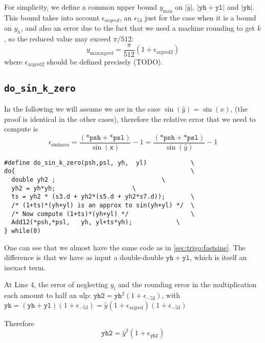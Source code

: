 For simplicity, we define a common upper bound $y_{\max}$ on
$|\hat{y}|$, $|\mathtt{yh}+\mathtt{yl}|$ and $|\mathtt{yh}|$. This
bound takes into account $\epsilon_{argred}$, an $\epsilon_{53}$ just
for the case when it is a bound on $y_h$, and also an error due to the
fact that we used a machine rounding to get $k$, so the reduced value
may exceed $\pi/512$:
\begin{equation}
  y_{\mathrm{maxargred}} = \frac{\pi}{512}(1+\epsilon_{\mathrm{argred2}})
  \label{eq:ymaxsink0}  
\end{equation}
where $\epsilon_{\mathrm{argred2}}$ should be defined precisely (TODO).


\subsection{\texttt{do\_sin\_k\_zero} \label{dosinkzero}}
In the following we will
assume we are in the case $\sin(\hat{y}) = \sin(x)$, (the proof is
identical in the other cases), therefore the relative error that we need
to compute is
\begin{equation}
  \epsilon_{\mathrm{sinkzero}} = \frac{(\mathtt{*psh} + \mathtt{*psl})}{\sin(\mathtt{x})} -1 = \frac{(\mathtt{*psh} + \mathtt{*psl})}{\sin(\hat{y})} -1
\end{equation}


 \begin{lstlisting}[caption={do\_sin\_k\_zero},firstnumber=1]
#define do_sin_k_zero(psh,psl, yh,  yl)            \
do{                                                \
  double yh2 ;	              			   \
  yh2 = yh*yh;					   \
  ts = yh2 * (s3.d + yh2*(s5.d + yh2*s7.d));	   \
  /* (1+ts)*(yh+yl) is an approx to sin(yh+yl) */  \
  /* Now compute (1+ts)*(yh+yl) */                 \
  Add12(*psh,*psl,   yh, yl+ts*yh);	           \
} while(0)						   
\end{lstlisting}

One can see that we almost have the same code as in
\ref{sec:trigo:fastsine}. The difference is that we have as input
a double-double $\mathtt{yh}+\mathtt{yl}$, which is itself an inexact term. 

At Line 4, the error of neglecting $y_l$ and the rounding error in the
multiplication each amount to half an ulp:
  $\mathtt{yh2}=\mathtt{yh}^2(1+\epsilon_{-53})$, 
 with $\mathtt{yh} = (\mathtt{yh}+\mathtt{yl})(1+\epsilon_{-53}) = \hat{y}(1+\epsilon_{\mathrm{argred}})(1+\epsilon_{-53})$

Therefore
\begin{equation}
  \mathtt{yh2}=\hat{y}^2(1+\epsilon_{\mathtt{yh2}})
\end{equation}


